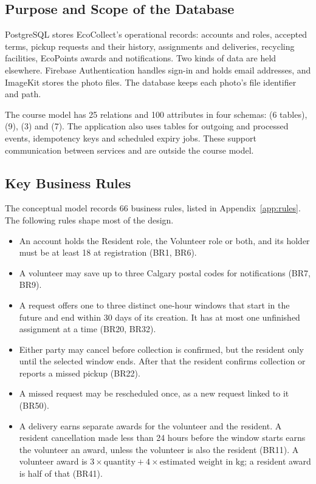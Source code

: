 \documentclass[11pt,letterpaper]{article}
\begin{document}
\subsection{Purpose and Scope of the Database}
PostgreSQL stores EcoCollect's operational records: accounts and roles, accepted terms, pickup requests and their history, assignments and deliveries, recycling facilities, EcoPoints awards and notifications. Two kinds of data are held elsewhere. Firebase Authentication handles sign-in and holds email addresses, and ImageKit stores the photo files. The database keeps each photo's file identifier and path.

The course model has 25 relations and 100 attributes in four schemas:  (6 tables),  (9),  (3) and  (7). The application also uses tables for outgoing and processed events, idempotency keys and scheduled expiry jobs. These support communication between services and are outside the course model.

\subsection{Key Business Rules}
The conceptual model records 66 business rules, listed in Appendix~\ref{app:rules}. The following rules shape most of the design.
\begin{itemize}
  \item An account holds the Resident role, the Volunteer role or both, and its holder must be at least 18 at registration (BR1, BR6).
  \item A volunteer may save up to three Calgary postal codes for notifications (BR7, BR9).
  \item A request offers one to three distinct one-hour windows that start in the future and end within 30 days of its creation. It has at most one unfinished assignment at a time (BR20, BR32).
  \item Either party may cancel before collection is confirmed, but the resident only until the selected window ends. After that the resident confirms collection or reports a missed pickup (BR22).
  \item A missed request may be rescheduled once, as a new request linked to it (BR50).
  \item A delivery earns separate awards for the volunteer and the resident. A resident cancellation made less than 24 hours before the window starts earns the volunteer an award, unless the volunteer is also the resident (BR11). A volunteer award is $3 \times \textrm{quantity} + 4 \times \textrm{estimated weight in kg}$; a resident award is half of that (BR41).
\end{itemize}
\end{document}
